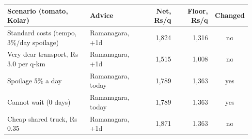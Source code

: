 \renewcommand{\arraystretch}{1.25}
\footnotesize
\begin{tabular}{|l|l|r|r|c|}
\hline
\textbf{Scenario (tomato, Kolar)} & \textbf{Advice} & \textbf{Net, Rs/q} & \textbf{Floor, Rs/q} & \textbf{Changed} \\
\hline
Standard costs (tempo, 3\%/day spoilage) & Ramanagara, +1d & 1,824 & 1,316 & no \\
\hline
Very dear transport, Rs 3.0 per q-km & Ramanagara, +1d & 1,515 & 1,008 & no \\
\hline
Spoilage 5\% a day & Ramanagara, today & 1,789 & 1,363 & yes \\
\hline
Cannot wait (0 days) & Ramanagara, today & 1,789 & 1,363 & yes \\
\hline
Cheap shared truck, Rs 0.35 & Ramanagara, +1d & 1,871 & 1,363 & no \\
\hline
\end{tabular}
